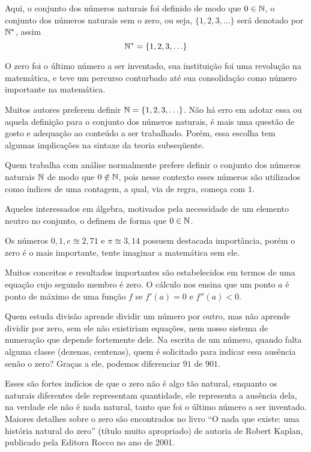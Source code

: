 \documentclass[glenn,refnum,codigo]{Estilo}
\begin{document}
Aqui, o conjunto dos números naturais foi definido de
modo que $0 \in \mathbb{N}$, o conjunto dos números naturais sem o zero, ou
seja, $\{1,2,3,\ldots\}$ será denotado por $\mathbb{N}^{*}$, assim
\[
\mathbb{N}^{*} = \{1,2,3,\ldots\}
\]

O zero foi o último número a ser inventado, sua
instituição foi uma revolução na matemática, e teve um percurso
conturbado até sua consolidação como número importante na
matemática.

Muitos autores preferem definir $\mathbb{N}=\{1,2,3,\ldots\}$. Não há erro em
adotar essa ou aquela definição para o conjunto dos números naturais,
é mais uma questão de gosto e adequação ao conteúdo a ser trabalhado.
Porém, essa escolha tem algumas implicações na sintaxe da teoria subseqüente.

Quem trabalha com análise normalmente prefere definir o conjunto dos
números naturais $\mathbb{N}$ de modo que $0 \notin \mathbb{N}$, pois nesse contexto esses
números são utilizados como índices de uma contagem, a qual, via de regra,
começa com $1$.

Aqueles interessados em álgebra, motivados pela necessidade de
um elemento neutro no conjunto, o definem de forma que $0 \in \mathbb{N}$.

Os números $0, 1, e \approxeq 2,71$ e $\pi \approxeq 3,14$ possuem
destacada importância, porém o zero é o mais importante, tente imaginar a
matemática sem ele.

Muitos conceitos e resultados importantes são estabelecidos em termos de
uma equação cujo segundo membro é zero. O cálculo nos ensina que um ponto
$a$ é ponto de máximo de uma função $f$ se $f'(a)=0$ e $f''(a)<0$.

Quem estuda divisão aprende dividir um número por outro,
mas não aprende dividir por zero, sem ele não existiriam equações, nem nosso
sistema de numeração que depende fortemente dele. Na escrita de um número,
quando falta alguma classe (dezenas, centenas), quem é solicitado
para indicar essa ausência senão o zero? Graças a ele, podemos diferenciar
$91$ de $901$.

Esses são fortes indícios de que o zero não é algo tão
natural, enquanto os naturais diferentes dele representam
quantidade, ele representa a ausência dela, na verdade ele não é
nada natural, tanto que foi o último número a ser inventado. Maiores
detalhes sobre o zero são encontrados no livro ``O nada que existe:
uma história natural do zero'' (título muito apropriado) de autoria
de Robert Kaplan, publicado pela Editora Rocco no ano de 2001.
\ajuste   %
\end{document}
